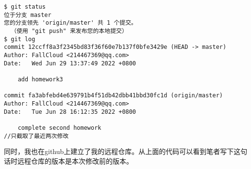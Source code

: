 \documentclass[UTF8]{article}
\begin{document}
\begin{verbatim}
$ git status
位于分支 master
您的分支领先 'origin/master' 共 1 个提交。
  （使用 "git push" 来发布您的本地提交）
$ git log
commit 12ccff8a3f2345bd83f36f60e7b137f0bfe3429e (HEAD -> master)
Author: FallCloud <214467369@qq.com>
Date:   Wed Jun 29 13:37:49 2022 +0800

    add homework3

commit fa3abfebd4e639791b4f51db42dbb41bbd30fc1d (origin/master)
Author: FallCloud <214467369@qq.com>
Date:   Tue Jun 28 16:12:35 2022 +0800

    complete second homework
//只截取了最近两次修改
\end{verbatim}

同时，我也在github上建立了我的远程仓库。从上面的代码可以看到笔者写下这句话时远程仓库的版本是本次修改前的版本。


\end{document}
